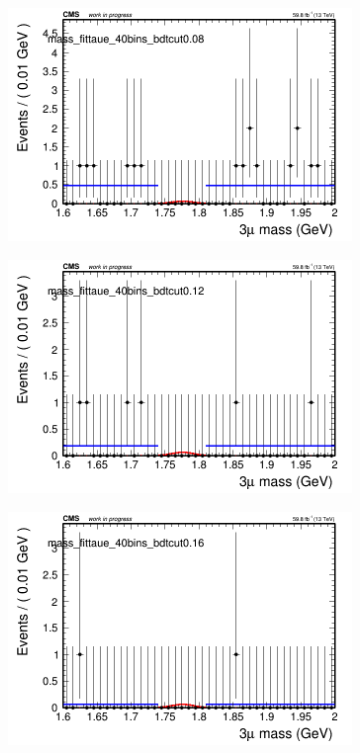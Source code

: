 \begin{figure}[H]
\begin{subfigure}{0.2\textwidth}
        \caption{}
    \end{subfigure}
    \begin{subfigure}{0.2\textwidth}
        \includegraphics[width=\textwidth]{flat_fit/plots/taue/massfit_taue_40bins_bdtcut0.08.png}
        \caption{}
    \end{subfigure}
    \begin{subfigure}{0.2\textwidth}
        \includegraphics[width=\textwidth]{flat_fit/plots/taue/massfit_taue_40bins_bdtcut0.12.png}
        \caption{}
    \end{subfigure}
    \begin{subfigure}{0.2\textwidth}
        \includegraphics[width=\textwidth]{flat_fit/plots/taue/massfit_taue_40bins_bdtcut0.16.png}

\end{subfigure}
\end{figure}
